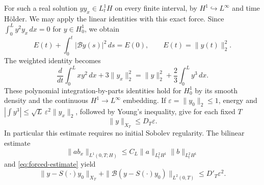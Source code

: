 \documentclass[11pt]{article}
\theoremstyle{remark}\newtheorem{remark}[theorem]{Remark}
\numberwithin{equation}{section}
\begin{document}
For such a real solution $yy_x\in L^1_tH$ on every finite interval, by
$H^1\hookrightarrow L^\infty$ and time H\"older. We may apply the linear
identities with this exact force. Since
$\int_0^L y^2y_x\,dx=0$ for $y\in H^1_0$, we obtain
\begin{equation}\label{eq:energy-nonlinear}
 E(t)+\int_0^t|\mathcal By(s)|^2\,ds=E(0),\qquad E(t)=\|y(t)\|_2^2.
\end{equation}
The weighted identity becomes
\[
 \frac d{dt}\int_0^L xy^2\,dx+3\|y_x\|_2^2
 =\|y\|_2^2+\frac23\int_0^L y^3\,dx.
\]
These polynomial integration-by-parts identities hold for $H^1_0$ by its
smooth density and the continuous $H^1\to L^\infty$ embedding.
If $\varepsilon=\|y_0\|_2\le1$, energy and
$\left|\int y^3\right|\le\sqrt L\,\varepsilon^2\|y_x\|_2$, followed by
Young's inequality, give for each fixed $T$
\begin{equation}\label{eq:nonlinear-bound}
 \|y\|_{X_T}\le D_T\varepsilon.
\end{equation}
In particular this estimate requires no initial Sobolev regularity.
The bilinear estimate
\begin{equation}\label{eq:product}
 \|ab_x\|_{L^1(0,T;H)}
 \le C_L\|a\|_{L^2_tH^1}\|b\|_{L^2_tH^1}
\end{equation}
and \eqref{eq:forced-estimate} yield
\begin{equation}\label{eq:first-expansion}
 \|y-S(\cdot)y_0\|_{X_T}
 +\|\mathcal B(y-S(\cdot)y_0)\|_{L^2(0,T)}
 \le D'_T\varepsilon^2.
\end{equation}
\end{document}
